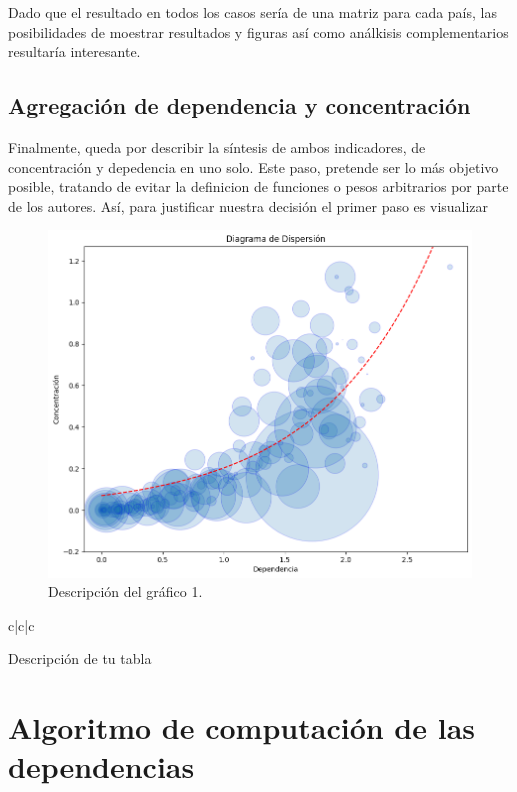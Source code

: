 \documentclass[5p,authoryear]{elsarticle}
\begin{document}
Dado que el resultado en todos los casos sería de una matriz para cada país, las posibilidades de moestrar resultados y figuras así como análkisis complementarios resultaría interesante. 

\subsection{Agregación de dependencia y concentración}

Finalmente, queda por describir la síntesis de ambos indicadores, de concentración y depedencia en uno solo. Este paso, pretende ser lo más objetivo posible, tratando de evitar la definicion de funciones o pesos arbitrarios por parte de los autores. 
Así, para justificar nuestra decisión el primer paso es visualizar 


\begin{figure}[t] %
    \centering
    \includegraphics[width=0.8\linewidth]{../Imagenes/scatter.png}
    \caption{Descripción del gráfico 1.}
    \label{fig:fig2}
\end{figure}


    
\begin{table}{c|c|c}
\caption{Descripción de tu tabla}
\begin{center}
\label{tab:mi_tabla}

\end{center}
\end{table}

\newpage
\appendix
\section{Algoritmo de computación de las dependencias}
\end{document}
